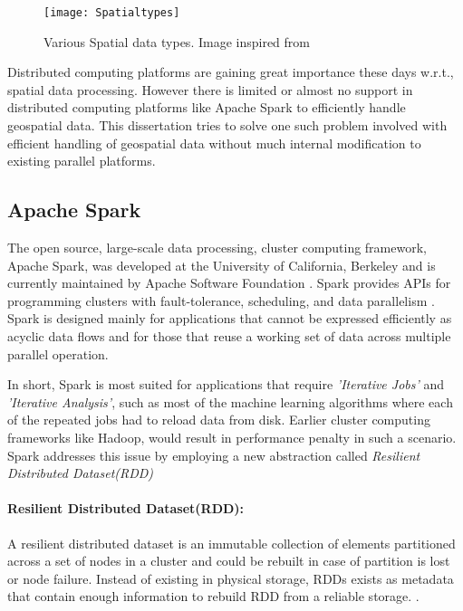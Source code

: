 \documentclass[article,type=msc,colorback,12pt,accentcolor=tud1d]{tudthesis}
\begin{document}
			   \begin{figure}[h]
				   	\centering
				   	\texttt{[image: Spatialtypes]}
				   	\caption{Various Spatial data types. Image inspired from \cite{spatialdatatypes}  }
				   	\label{fig:spatialdatatypes}
			   \end{figure}
			  
			   Distributed computing platforms are gaining great importance these days w.r.t., spatial data processing. However there is limited or almost no support in distributed computing platforms like Apache Spark to efficiently handle geospatial data. This dissertation tries to solve one such problem involved with efficient handling of geospatial data without much internal modification to existing parallel platforms.
			   
			   \clearpage
		   \subsection{Apache Spark}
		   
		   \par The open source, large-scale data processing, cluster computing framework, Apache Spark\cite{sparkmainpaper}, was developed at the University of California, Berkeley and is currently maintained by Apache Software Foundation \cite{sparkHomePage} . Spark provides APIs for programming clusters with fault-tolerance, scheduling, and data parallelism \cite{wiki:spark}. Spark is designed mainly for applications that cannot be expressed efficiently as acyclic data flows and for those that reuse a working set of data across multiple parallel operation. 
		   
		   In short, Spark is most suited for applications that require \textit{'Iterative Jobs'} and \textit{'Iterative Analysis'}, such as most of the machine learning algorithms where each of the repeated jobs had to reload data from disk. Earlier cluster computing frameworks like Hadoop, would result in performance penalty in such a scenario. Spark addresses this issue by employing a new abstraction called \textit{Resilient Distributed Dataset(RDD)} \cite{sparkmainpaper}
		   
		   \paragraph{Resilient Distributed Dataset(RDD):}
		   
		   A resilient distributed dataset is an immutable collection of elements partitioned across a set of nodes in a cluster and could be rebuilt in case of partition is lost or node failure. Instead of existing in physical storage, RDDs exists as metadata that contain enough information to rebuild RDD from a reliable storage. \cite{sparkmainpaper}. 
		   
\end{document}
